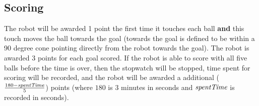 \documentclass[12pt]{article}
\begin{document}
\subsection{Scoring}
The robot will be awarded 1 point the first time it touches each ball {\bf and} this touch moves the ball towards the goal (towards the goal is defined to be within a 90 degree cone pointing directly from the robot towards the goal).  The robot is awarded 3 points for each goal scored.  If the robot is able to score with all five balls before the time is over, then the stopwatch will be stopped, time spent for scoring will be recorded, and the robot will be awarded a additional ($\frac{180 - \emph{spentTime}}{5}$) points (where $180$ is 3 minutes in seconds and $\emph{spentTime}$ is recorded in seconds).
\end{document}
